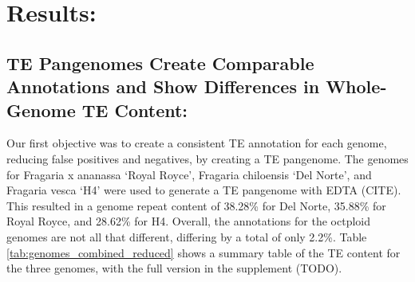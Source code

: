 \documentclass[fleqn,10pt]{olplainarticle}
\begin{document}
% 
% 
% 
% 







\section{Results:}
\subsection{TE Pangenomes Create Comparable Annotations and Show Differences in Whole-Genome TE Content:}
Our first objective was to create a consistent TE annotation for each genome, reducing false positives and negatives, by creating a TE pangenome.
The genomes for Fragaria x ananassa `Royal Royce', Fragaria chiloensis `Del Norte', and Fragaria vesca `H4' were used to generate a TE pangenome with EDTA (CITE).
This resulted in a genome repeat content of 38.28\% for Del Norte, 35.88\% for Royal Royce, and 28.62\% for H4.
Overall, the annotations for the octploid genomes are not all that different, differing by a total of only 2.2\%.
Table \ref{tab:genomes_combined_reduced} shows a summary table of the TE content for the three genomes, with the full version in the supplement (TODO).
\end{document}
